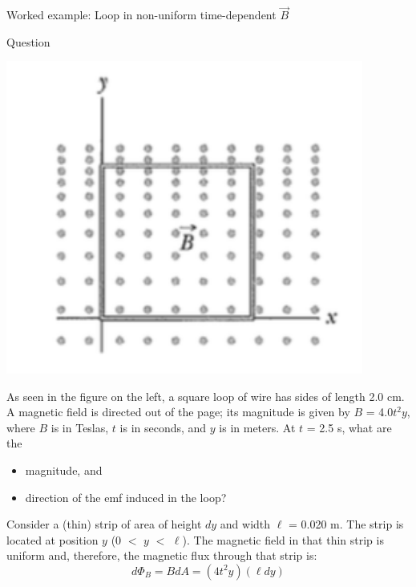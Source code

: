 {
\problemslide

%
%
%

\begin{frame}{Worked example: Loop in non-uniform time-dependent $\vec{B}$}

  \begin{blockexmplque}{Question}

  \begin{minipage}[l]{0.34\textwidth}
   \begin{center}
  	 \includegraphics[width=0.88\textwidth]{./images/problems/lect08_square_loop_in_nonuniform_bfield}\\
   \end{center}
  \end{minipage}
  \begin{minipage}[r]{0.65\textwidth}
    As seen in the figure on the left, a square loop of wire has sides of
    length 2.0 cm. A magnetic field is directed out of the page; its magnitude
    is given by $B$ = 4.0$t^2$$y$, where $B$ is in Teslas, $t$ is in seconds,
    and $y$ is in meters.
    At $t$ = 2.5 s, what are the
    \begin{itemize}
      \item magnitude, and
      \item direction of the emf induced in the loop?
    \end{itemize}
  \end{minipage}

  \end{blockexmplque}

  Consider a (thin) strip of area of height $dy$ and width $\ell$ = 0.020 m.
  The strip is located at position $y$ (0 $<$ $y$ $<$ $\ell$).
  The magnetic field in that thin strip is uniform and, therefore,
  the magnetic flux through that strip is:
  \begin{equation*}
     d\Phi_{B} = B dA = (4 t^2 y)(\ell dy)
  \end{equation*}


\end{frame}}
